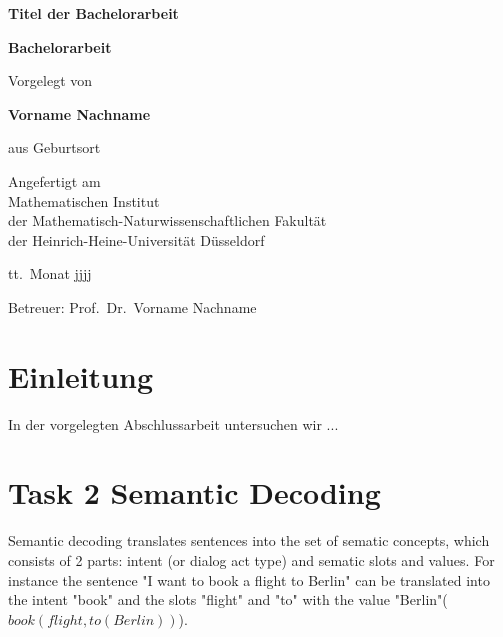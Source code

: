 \documentclass[12pt,titlepage,a4paper]{article}
\begin{document}
\begin{titlepage}
\begin{center}

\textbf{\LARGE Titel der Bachelorarbeit}

\bigskip\bigskip
\textbf{Bachelorarbeit}

\bigskip\bigskip\bigskip
Vorgelegt von

\bigskip
\textbf{Vorname Nachname}

\bigskip
aus Geburtsort


\vfill
Angefertigt am\\
Mathematischen Institut\\ 
der Mathematisch-Naturwissenschaftlichen Fakult\"at\\ 
der Heinrich-Heine-Universit\"at D\"usseldorf

\bigskip
tt.\ Monat jjjj

\bigskip
Betreuer: Prof.\ Dr.\ Vorname Nachname

\end{center}
\end{titlepage}

\thispagestyle{empty}\mbox{}\pagebreak
\setcounter{page}{0}

\tableofcontents
\pagebreak


\section*{Einleitung}

In der vorgelegten Abschlussarbeit untersuchen wir ...


\pagebreak
\section{Task 2 Semantic Decoding}
Semantic decoding translates sentences into the set of sematic concepts, which consists of 2 parts: intent (or dialog act type) and sematic slots and values. For instance the sentence "I want to book a flight to Berlin" can be translated into the intent "book" and the slots "flight" and "to" with the value "Berlin"($book(flight, to(Berlin))$).
\end{document}
